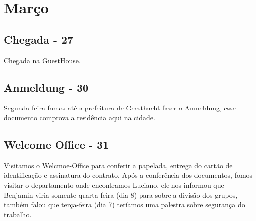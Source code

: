 \chapter{Março}
\section{Chegada - 27}
Chegada na GuestHouse.

\section{Anmeldung - 30}
Segunda-feira fomos até a prefeitura de Geesthacht fazer o Anmeldung, esse documento comprova a residência aqui na cidade.

\section{Welcome Office - 31}
Visitamos o Welcmoe-Office para conferir a papelada, entrega do cartão de identificação e assinatura do contrato. Após a conferência dos documentos, fomos visitar o departamento onde encontramos Luciano, ele nos informou que Benjamin viria somente quarta-feira (dia 8) para sobre a divisão dos grupos, também falou que terça-feira (dia 7) teríamos uma palestra sobre segurança do trabalho.

